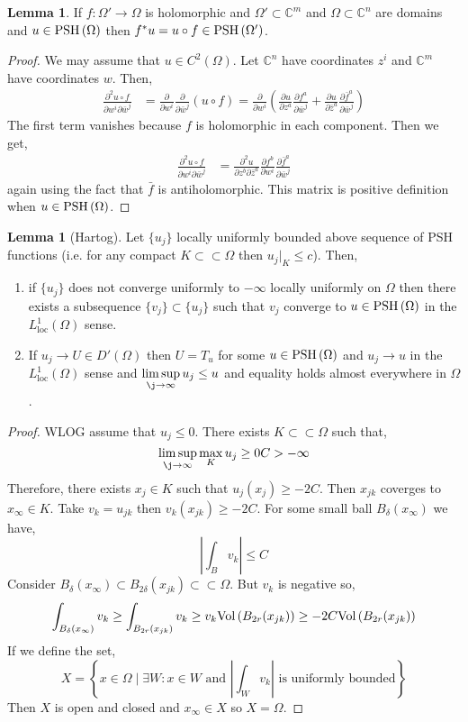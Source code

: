 \documentclass[12pt]{extarticle}
\newcommand{\C}{\mathbb{C}}
\newcommand{\pderiv}[2]{\frac{\partial{#1}}{\partial{#2}}}
\theoremstyle{definition}
\newtheorem{lemma}[theorem]{Lemma}
\begin{document}
\begin{lemma}
If $f : \Omega' \to \Omega$ is holomorphic and $\Omega' \subset \C^m$ and $\Omega \subset \C^n$ are domains and $u \in \mathrm{PSH}\left( \Omega \right)$ then $f^* u = u \circ f \in \mathrm{PSH}\left( \Omega' \right)$.
\end{lemma}

\begin{proof}
We may assume that $u \in C^2(\Omega)$. Let $\C^n$ have coordinates $z^i$ and $\C^m$ have coordinates $w$. Then,
\begin{align*}
\frac{\partial^2 u \circ f}{\partial w^i \partial \bar{w}^j} & = \pderiv{}{w^i} \pderiv{}{\bar{w}^j} (u \circ f) = \pderiv{}{w^i} \left( \pderiv{u}{z^a} \pderiv{f^a}{\bar{w}^j} + \pderiv{u}{\bar{z}^a} \pderiv{\bar{f}^a}{\bar{w}^j} \right)
\end{align*}
The first term vanishes because $f$ is holomorphic in each component. Then we get,
\begin{align*}
\frac{\partial^2 u \circ f}{\partial w^i \partial \bar{w}^j} & = \frac{\partial^2 u}{\partial z^b \partial \bar{z}^a} \pderiv{f^b}{w^i} \pderiv{\bar{f}^a}{\bar{w}^j}
\end{align*}
again using the fact that $\bar{f}$ is antiholomorphic. This matrix is positive definition when $u \in \mathrm{PSH}\left( \Omega \right)$. 
\end{proof}

\begin{lemma}[Hartog]
Let $\{ u_j \}$ locally uniformly bounded above sequence of PSH functions (i.e. for any compact $K \subset \subset \Omega$ then $u_j |_K \le c$). Then,
\begin{enumerate}
\item if $\{ u_j \}$ does not converge uniformly to $-\infty$ locally uniformly on $\Omega$ then there exists a subsequence $\{ v_j \} \subset \{u_j \}$ such that $v_j$ converge to $u \in \mathrm{PSH}\left( \Omega \right)$ in the $L^1_{\text{loc}}(\Omega)$ sense.
\item If $u_j \to U \in D'(\Omega)$ then $U = T_u$ for some $u \in \mathrm{PSH}\left( \Omega \right)$ and $u_j \to u$ in the $L^1_{\text{loc}}(\Omega)$ sense and $\limsup\limits_{\j \to \infty} u_j \le u$ and equality holds almost everywhere in $\Omega$. 
\end{enumerate} 
\end{lemma}

\begin{proof}
WLOG assume that $u_j \le 0$. There exists $K \subset \subset \Omega$ such that,
\[ \limsup_{\j \to \infty} \max_K u_j \ge 0 C > - \infty \]
Therefore, there exists $x_j \in K$ such that $u_j(x_j) \ge -2 C$. Then $x_{jk}$ coverges to $x_\infty \in K$. Take $v_k = u_{jk}$ then $v_k(x_{jk}) \ge - 2C$. For some small ball $B_\delta(x_\infty)$ we have,
\[ \left| \int_B v_k \right| \le C \]
Consider $B_\delta(x_\infty) \subset B_{2\delta}(x_{jk}) \subset \subset \Omega$. But $v_k$ is negative so,
\[ \int_{B_\delta(x_\infty)} v_k \ge \int_{B_{2r}(x_{jk})} v_k \ge v_k \mathrm{Vol}\left(B_{2r}(x_{jk})\right) \ge -2 C \mathrm{Vol}\left(B_{2r}(x_{jk})\right) \]
If we define the set,
\[ X = \left\{ x \in \Omega \mid \exists W : x \in W \text{ and } \left| \int_W v_k \right| \text{ is uniformly bounded} \right\} \]
Then $X$ is open and closed and $x_\infty \in X$ so $X = \Omega$. 
\end{proof}
\end{document}
